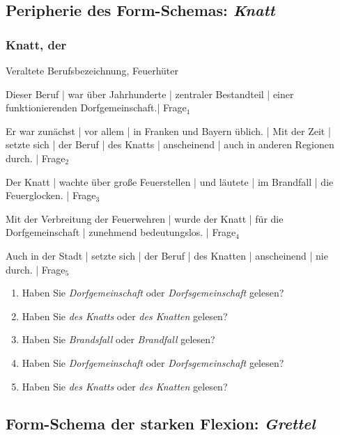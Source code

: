 \subsection{Peripherie des Form-Schemas: \textit{Knatt}}

\subsubsection*{Knatt, der}
Veraltete Berufsbezeichnung, Feuerhüter
\begin{SchmittAppendixList}
\item Dieser Beruf | war über Jahrhunderte | zentraler Bestandteil | einer funktionierenden Dorfgemeinschaft.| Frage$_1$ 
\item Er war zunächst |  vor allem | in Franken und Bayern üblich. | Mit der Zeit | setzte sich | der Beruf | des Knatts | anscheinend | auch in anderen Regionen durch. | Frage$_2$ 
\item Der Knatt | wachte über große Feuerstellen | und läutete | im Brandfall |  die Feuerglocken. | Frage$_3$   
\item Mit der Verbreitung der Feuerwehren | wurde der Knatt | für die Dorfgemeinschaft | zunehmend bedeutungslos. | Frage$_4$ 
\item Auch in der Stadt | setzte sich |  der Beruf | des Knatten | anscheinend | nie durch. | Frage$_5$  
\end{SchmittAppendixList}

\begin{enumerate}
\item Haben Sie \textit{Dorfgemeinschaft} oder \textit{Dorfsgemeinschaft} gelesen?
\item Haben Sie \textit{des Knatts} oder \textit{des Knatten} gelesen?   
\item Haben Sie \textit{Brandsfall} oder \textit{Brandfall} gelesen?   
\item Haben Sie \textit{Dorfgemeinschaft} oder \textit{Dorfsgemeinschaft} gelesen? 
\item Haben Sie \textit{des Knatts} oder \textit{des Knatten} gelesen?
\end{enumerate}

\subsection{Form-Schema der starken Flexion: \textit{Grettel}}

